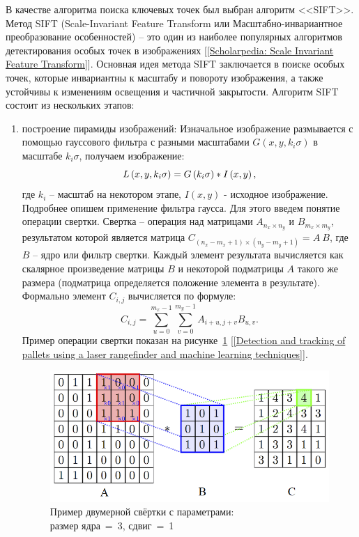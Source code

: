 \documentclass[14pt, a4paper]{extreport}
\begin{document}
	В качестве алгоритма поиска ключевых точек был выбран алгоритм <<SIFT>>. Метод SIFT (Scale-Invariant Feature Transform или Масштабно-\linebreak инвариантное преобразование особенностей) -- это один из наиболее популярных алгоритмов детектирования особых точек в изображениях [\ref{Scholarpedia: Scale Invariant Feature Transform}]. Основная идея метода SIFT заключается в поиске особых точек, которые инвариантны к масштабу и повороту изображения, а также устойчивы к изменениям освещения и частичной закрытости. Алгоритм SIFT состоит из нескольких этапов:
	\begin{enumerate}[label={\arabic*)}]
		\item построение пирамиды изображений: Изначальное изображение размывается с помощью гауссового фильтра с разными масштабами $G\left(x,y,k_i\sigma \right)$ в масштабе $k_i\sigma$, получаем изображение: 
		\vspace*{-0.2cm}
		\begin{equation*}
			L\left(x,y,k_i\sigma \right)=G\left(k_i\sigma \right)*I\left(x,y\right), 
			\label{L(x,y,sigma)}
			\vspace*{-0.4cm}
		\end{equation*}
		где $k_i$ -- масштаб на некотором этапе, $I\left(x,y\right)$ - исходное изображение. 
		Подробнее опишем применение фильтра гаусса. Для этого введем понятие операции свертки. Свертка -- операция над матрицами $A_{n_x \times n_y}$ и $B_{m_x \times m_y}$, результатом которой является матрица $C_{(n_x - m_x + 1)\times(n_y - m_y + 1)}=A~B$, где $B$ -- ядро или фильтр свертки. Каждый элемент результата вычисляется как скалярное произведение матрицы $B$ и некоторой подматрицы $A$ такого же размера (подматрица определяется положение элемента в результате). Формально элемент $C_{i,j}$ вычисляется по формуле: 
		\begin{equation*}
			C_{i, j} = \sum_{u=0}^{m_x - 1} \sum_{v = 0}^{m_y - 1} A_{i+u, j+v}B_{u, v}. 
			\label{eq:Cij1}
		\end{equation*}
		Пример операции свертки показан на рисунке~\ref{fig:conv} [\ref{Detection and tracking of pallets using a laser rangefinder and machine learning techniques}].
		\begin{figure}[ht!]
			\centering
			\includegraphics[width=\textwidth]{image/chapter_2/conv-example.png}
			\caption{Пример двумерной свёртки с параметрами:\\ размер ядра~=~3, сдвиг~=~1}
			\label{fig:conv}
		\end{figure}
		

\end{enumerate}
\end{document}
